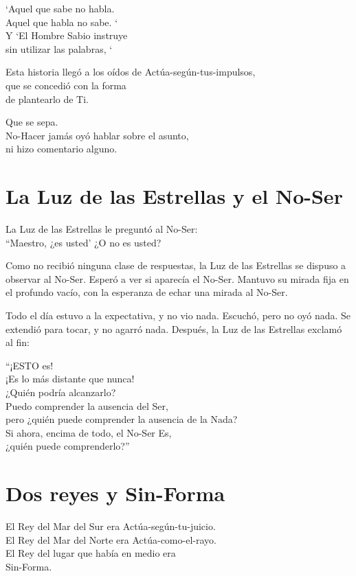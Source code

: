\documentclass[book,b5paper,hidelinks,final]{memoir}
\begin{document}
	`Aquel que sabe no habla.\\
	Aquel que habla no sabe. `\\
	Y `El Hombre Sabio instruye\\
	sin utilizar las palabras, `
	
	Esta historia llegó a los oídos de Actúa-según-tus-impulsos,\\
	que se concedió con la forma\\
	de plantearlo de Ti.
	
	Que se sepa.\\
	No-Hacer jamás oyó hablar sobre el asunto,\\
	ni hizo comentario alguno.
	
	\chapter*{La Luz de las Estrellas y el No-Ser}
	
	La Luz de las Estrellas le preguntó al No-Ser:\\
	``Maestro, ¿es usted' ¿O no es usted?
	
	Como no recibió ninguna clase de respuestas, la Luz de las Estrellas se
	dispuso a observar al No-Ser. Esperó a ver si aparecía el No-Ser.
	Mantuvo su mirada fija en el profundo vacío, con la esperanza de echar
	una mirada al No-Ser.
	
	Todo el día estuvo a la expectativa, y no vio nada. Escuchó, pero no oyó
	nada. Se extendió para tocar, y no agarró nada. Después, la Luz de las
	Estrellas exclamó al fin:
	
	``¡ESTO es!\\
	¡Es lo más distante que nunca!\\
	¿Quién podría alcanzarlo?\\
	Puedo comprender la ausencia del Ser,\\
	pero ¿quién puede comprender la ausencia de la Nada?\\
	Si ahora, encima de todo, el No-Ser Es,\\
	¿quién puede comprenderlo?''
	
	\chapter*{Dos reyes y Sin-Forma}
	
	El Rey del Mar del Sur era Actúa-según-tu-juicio.\\
	El Rey del Mar del Norte era Actúa-como-el-rayo.\\
	El Rey del lugar que había en medio era\\
	Sin-Forma.
	
\end{document}
